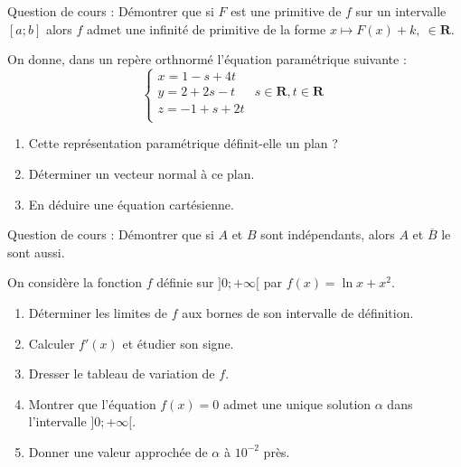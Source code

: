 \begin{question}[topic=intégrale]
  Question de cours : Démontrer que si $F$ est une primitive de $f$ sur un
  intervalle $[a;b]$ alors $f$ admet une infinité de primitive de la forme
  $x\mapsto F(x) + k,\ \in\mathbf{R}$.
\end{question}

\begin{question}[topic=géométrie]
  On donne, dans un repère orthnormé l'équation paramétrique suivante :
  \[ \left\lbrace \begin{array}{lc}
      x = 1 - s + 4t &                                 \\
      y = 2 + 2s -t  & s\in\mathbf{R}, t\in \mathbf{R} \\
      z = -1 +s + 2t &                                 \\
  \end{array}\right.\]

  \begin{enumerate}
    \item Cette représentation paramétrique définit-elle un plan ?
    \item Déterminer un vecteur normal à ce plan.
    \item En déduire une équation cartésienne.
  \end{enumerate}
\end{question}

\begin{question}[topic=probabilités]
  Question de cours : Démontrer que si $A$ et $B$ sont indépendants, alors
  $A$ et $\overline{B}$ le sont aussi.
\end{question}

\begin{question}[topic=fonction]
  On considère la fonction $f$ définie sur $]0;+\infty[$ par $f(x) = \ln x
  + x^2$.

  \begin{enumerate}
    \item Déterminer les limites de $f$ aux bornes de son intervalle de
      définition.
    \item Calculer $f'(x)$ et étudier son signe.
    \item Dresser le tableau de variation de $f$.
    \item Montrer que l'équation $f(x) = 0$ admet une unique solution
      $\alpha$ dans l'intervalle $]0;+\infty[$.
    \item Donner une valeur approchée de $\alpha$ à $10^{-2}$ près.
  \end{enumerate}
\end{question}

